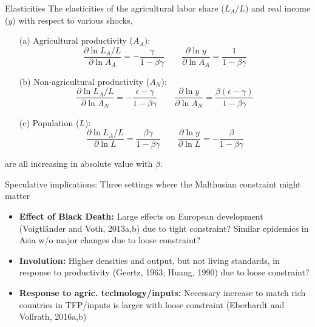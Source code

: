 \documentclass[10pt, xcolor=dvipsnames]{beamer}
\begin{document}
\begin{frame}{Elasticities}
The elasticities of the agricultural labor share ($L_A/L$) and real income ($y$) with respect to various shocks,
\begin{enumerate}
  \item[(a)] Agricultural productivity ($A_A$): 
\begin{equation}
  \frac{\partial \ln L_A/L}{\partial \ln A_A} = - \frac{\gamma}{1-\beta\gamma} \quad \quad \frac{\partial \ln y}{\partial \ln A_A} = \frac{1}{1-\beta\gamma}
\end{equation}
  \item[(b)] Non-agricultural productivity ($A_N$): 
\begin{equation}
  \frac{\partial \ln L_A/L}{\partial \ln A_N} = - \frac{\epsilon-\gamma}{1-\beta\gamma} \quad \quad \frac{\partial \ln y}{\partial \ln A_N} = \frac{\beta(\epsilon-\gamma)}{1-\beta\gamma}
\end{equation}
  \item[(c)] Population ($L$): 
\begin{equation}
  \frac{\partial \ln L_A/L}{\partial \ln L} = \frac{\beta\gamma}{1-\beta\gamma} \quad \quad \frac{\partial \ln y}{\partial \ln L} = - \frac{\beta}{1-\beta\gamma}
\end{equation}
\end{enumerate}
are all increasing in absolute value with $\beta$.
\end{frame}

\begin{frame}{Speculative implications:}
Three settings where the Malthusian constraint might matter
\begin{itemize}
  \item \textbf{Effect of Black Death:} Large effects on European development (Voigtl{\"a}nder and Voth, 2013a,b) due to tight constraint? Similar epidemics in Asia w/o major changes due to loose constraint?
  \item \textbf{Involution:} Higher densities and output, but not living standards, in response to productivity (Geertz, 1963; Huang, 1990) due to loose constraint?
  \item \textbf{Response to agric. technology/inputs:} Necessary increase to match rich countries in TFP/inputs is larger with loose constraint (Eberhardt and Vollrath, 2016a,b)
\end{itemize}
\end{frame}
\end{document}
